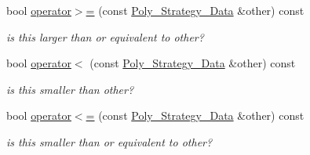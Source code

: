 \begin{Indent}
\begin{DoxyCompactItemize}
\mbox{\label{class_poly___strategy___data_a10eaa72d8dd9d02be47c7450d0358911}} 
bool \hyperlink{class_poly___strategy___data_a10eaa72d8dd9d02be47c7450d0358911}{operator$>$=} (const \hyperlink{class_poly___strategy___data}{Poly\+\_\+\+Strategy\+\_\+\+Data} \&other) const
\begin{DoxyCompactList}\small\item\em is {\ttfamily this} larger than or equivalent to other? \end{DoxyCompactList}\item 
\mbox{\label{class_poly___strategy___data_a77f188486ec685a0848eb8ff21d9c1cc}} 
bool \hyperlink{class_poly___strategy___data_a77f188486ec685a0848eb8ff21d9c1cc}{operator$<$} (const \hyperlink{class_poly___strategy___data}{Poly\+\_\+\+Strategy\+\_\+\+Data} \&other) const
\begin{DoxyCompactList}\small\item\em is {\ttfamily this} smaller than other? \end{DoxyCompactList}\item 
\mbox{\label{class_poly___strategy___data_a861774f75e0585613a250483728a7ed2}} 
bool \hyperlink{class_poly___strategy___data_a861774f75e0585613a250483728a7ed2}{operator$<$=} (const \hyperlink{class_poly___strategy___data}{Poly\+\_\+\+Strategy\+\_\+\+Data} \&other) const
\begin{DoxyCompactList}\small\item\em is {\ttfamily this} smaller than or equivalent to other? \end{DoxyCompactList}\end{DoxyCompactItemize}
\end{Indent}
